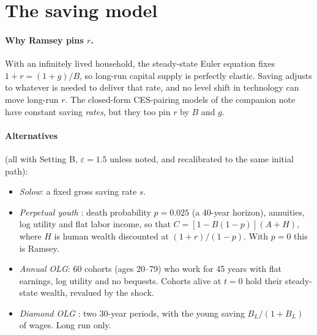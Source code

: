 \documentclass[11pt]{article}
\newcommand{\e}{\varepsilon}
\begin{document}
\section{The saving model}

\paragraph{Why Ramsey pins $r$.} With an infinitely lived household, the steady-state
Euler equation fixes $1+r=(1+g)/B$, so long-run capital supply is perfectly
elastic. Saving adjusts to whatever is needed to deliver that rate, and no level shift
in technology can move long-run $r$. The closed-form CES-pairing models of the
companion note have constant saving \emph{rates}, but they too pin $r$ by $B$ and $g$.

\paragraph{Alternatives} (all with Setting B, $\e=1.5$ unless noted, and recalibrated to the same initial path):
\begin{itemize}
\item \emph{Solow}: a fixed gross saving rate $s$.
\item \emph{Perpetual youth} \citep{blanchard1985,yaari1965}: death probability $p=0.025$
(a 40-year horizon), annuities, log utility and flat labor income, so that
$C=[1-B(1-p)](A+H)$, where $H$ is human wealth discounted at $(1+r)/(1-p)$. With $p=0$ this is Ramsey.
\item \emph{Annual OLG}: 60 cohorts (ages 20--79) who work for 45 years with flat earnings, log
utility and no bequests. Cohorts alive at $t=0$ hold their steady-state wealth,
revalued by the shock.
\item \emph{Diamond OLG} \citep{diamond1965}: two 30-year periods, with the young saving
$B_L/(1+B_L)$ of wages. Long run only.
\end{itemize}
\end{document}
